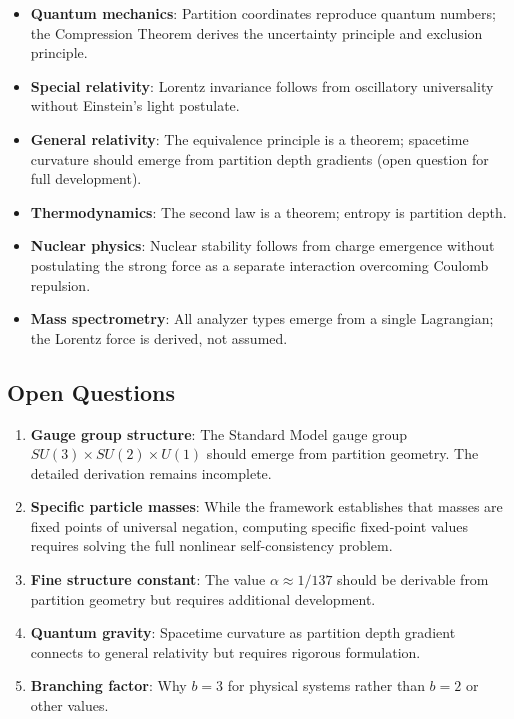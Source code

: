 \documentclass[twocolumn,10pt,a4paper]{article}
\theoremstyle{definition}
\theoremstyle{remark}
\begin{document}
\begin{itemize}
    \item \textbf{Quantum mechanics}: Partition coordinates reproduce quantum numbers; the Compression Theorem derives the uncertainty principle and exclusion principle.

    \item \textbf{Special relativity}: Lorentz invariance follows from oscillatory universality without Einstein's light postulate.

    \item \textbf{General relativity}: The equivalence principle is a theorem; spacetime curvature should emerge from partition depth gradients (open question for full development).

    \item \textbf{Thermodynamics}: The second law is a theorem; entropy is partition depth.

    \item \textbf{Nuclear physics}: Nuclear stability follows from charge emergence without postulating the strong force as a separate interaction overcoming Coulomb repulsion.

    \item \textbf{Mass spectrometry}: All analyzer types emerge from a single Lagrangian; the Lorentz force is derived, not assumed.
\end{itemize}

\subsection{Open Questions}

\begin{enumerate}
    \item \textbf{Gauge group structure}: The Standard Model gauge group $SU(3) \times SU(2) \times U(1)$ should emerge from partition geometry. The detailed derivation remains incomplete.

    \item \textbf{Specific particle masses}: While the framework establishes that masses are fixed points of universal negation, computing specific fixed-point values requires solving the full nonlinear self-consistency problem.

    \item \textbf{Fine structure constant}: The value $\alpha \approx 1/137$ should be derivable from partition geometry but requires additional development.

    \item \textbf{Quantum gravity}: Spacetime curvature as partition depth gradient connects to general relativity but requires rigorous formulation.

    \item \textbf{Branching factor}: Why $b = 3$ for physical systems rather than $b = 2$ or other values.
\end{enumerate}
\end{document}
